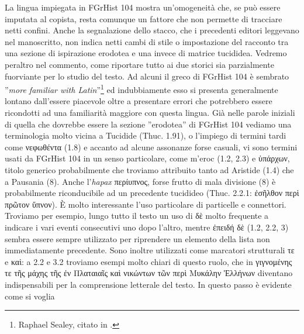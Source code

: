 La lingua impiegata in FGrHist 104 mostra un'omogeneità che, se
può essere imputata al copista, resta comunque un fattore che non permette di
tracciare netti confini. Anche la segnalazione dello stacco, che i precedenti
editori leggevano nel manoscritto, non indica netti cambi di stile o
impostazione del racconto tra una sezione di ispirazione erodotea e una
invece di matrice tucididea. Vedremo peraltro nel commento, come riportare
tutto ai due storici sia parzialmente fuorviante per lo studio del testo. 
Ad
alcuni il greco di FGrHist 104 è sembrato
''\textit{more
familiar with
Latin}''\footnote{Raphael
Sealey, citato in \cite[259 n.7]{Frost2005}.} ed indubbiamente esso si presenta generalmente lontano
dall'essere piacevole oltre a presentare errori che
potrebbero essere ricondotti ad una familiarità maggiore con questa lingua.
Già nelle parole iniziali di quella che dovrebbe
essere la sezione ''erodotea'' di FGrHist 104 vediamo una terminologia molto
vicina a Tucidide (Thuc. 1.91), o l'impiego di termini
tardi come \textgreek{νεφωθέντα} (1.8) e accanto ad alcune assonanze forse casuali, vi sono termini usati da FGrHist 104 in un senso particolare, come
\textgreek{m'eroc (1.2, 2.3) }e  \textgreek{ὑπάρχων}, titolo generico
probabilmente che troviamo attribuito tanto ad Aristide (1.4) che a Pausania
(8). Anche l'\textit{hapax}
\textgreek{περίυπνος}, forse frutto di mala divisione (8) è probabilmente
riconducibile ad un precedente tucidideo (Thuc.
2.2.1: \textgreek{ἐσῆλθον περὶ πρῶτον ὕπνον}). È molto interessante
l'uso particolare di particelle e connettori. Troviamo per
esempio, lungo tutto il testo un uso di
\textgreek{δὲ} molto frequente a indicare i vari
eventi consecutivi uno dopo
l'altro, mentre 
\textgreek{ἐπειδή δὲ} (1.2, 2.2,
3) sembra essere
sempre utilizzato per riprendere un elemento della
lista non immediatamente precedente. Sono inoltre utilizzati come marcatori
strutturali \textgreek{τε} e \textgreek{καὶ}: a
2.2 e 3.2 troviamo esempi molto chiari di questo
ruolo, che in  \textgreek{γιγνομένης τε τῆς μάχης τῆς ἐν Πλαταιαῖς καὶ νικώντων τῶν περὶ Μυκάλην Ἑλλήνων} diventano indispensabili per la
comprensione letterale del testo. In questo passo è evidente come si voglia
